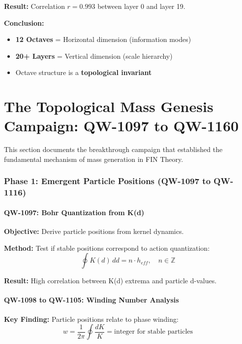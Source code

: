 \documentclass[11pt, a4paper]{article}
\theoremstyle{remark}
\begin{document}
\textbf{Result:} Correlation $r = 0.993$ between layer 0 and layer 19.

\textbf{Conclusion:}
\begin{itemize}
    \item \textbf{12 Octaves} = Horizontal dimension (information modes)
    \item \textbf{20+ Layers} = Vertical dimension (scale hierarchy)
    \item Octave structure is a \textbf{topological invariant}
\end{itemize}

\part{The Topological Mass Genesis Campaign: QW-1097 to QW-1160}

This section documents the breakthrough campaign that established the fundamental mechanism of mass generation in FIN Theory.

\section{Phase 1: Emergent Particle Positions (QW-1097 to QW-1116)}

\subsection{QW-1097: Bohr Quantization from K(d)}

\textbf{Objective:} Derive particle positions from kernel dynamics.

\textbf{Method:} Test if stable positions correspond to action quantization:
\begin{equation}
\oint K(d) \, dd = n \cdot h_{eff}, \quad n \in \mathbb{Z}
\end{equation}

\textbf{Result:} High correlation between K(d) extrema and particle d-values.

\subsection{QW-1098 to QW-1105: Winding Number Analysis}

\textbf{Key Finding:} Particle positions relate to phase winding:
\begin{equation}
w = \frac{1}{2\pi} \oint \frac{dK}{K} = \text{integer for stable particles}
\end{equation}
\end{document}
